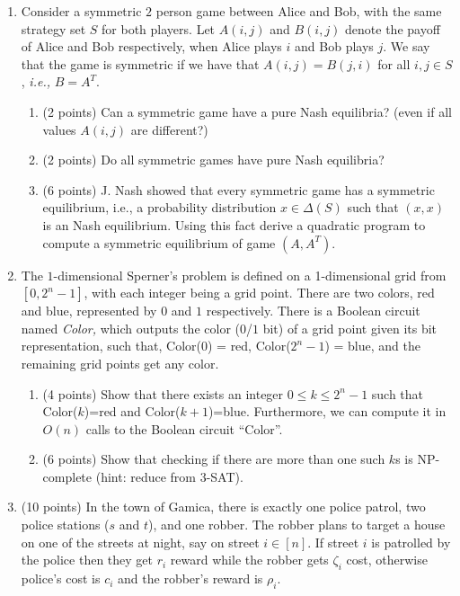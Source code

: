 \documentclass[11pt]{article}
\begin{document}
\begin{enumerate}
\item Consider a symmetric $2$ person game between Alice and Bob, with the same strategy set $S$ for both players. Let $A(i, j)$ and $B(i,j)$ denote the payoff of Alice and Bob respectively, when Alice plays $i$ and Bob plays $j$. We say that the game is symmetric if we have that $A(i,j) = B(j,i)$ for all $i,j \in S$, {\em i.e.,} $B=A^T$.

\begin{enumerate}
    \item (2 points) Can a symmetric game have a pure Nash equilibria? (even if all values $A(i,j)$ are different?)
    \item (2 points) Do all symmetric games have pure Nash equilibria?
    \item (6 points) J. Nash showed that every symmetric game has a symmetric equilibrium, i.e., a probability distribution $x\in \Delta(S)$ such that $(x,x)$ is an Nash equilibrium. Using this fact derive a quadratic program to compute a symmetric equilibrium of game $(A,A^T)$. \\
\end{enumerate}

\item The $1$-dimensional Sperner's problem is defined on a 1-dimensional grid from $[0, 2^n-1]$, with each integer being a grid
point. There are two colors, red and blue, represented by $0$ and $1$ respectively. 
There is a Boolean circuit named {\em Color,} which outputs the color ($0$/$1$ bit) of a grid point given its bit representation, such that,
Color($0$) = red, Color($2^n-1$) = blue, and the remaining grid points get any color.

\begin{enumerate}
    \item (4 points) Show that there exists an integer $0\le k \le 2^n-1$ such that Color($k$)=red and Color($k+1$)=blue. Furthermore, we can compute it in $O(n)$ calls to the Boolean circuit ``Color''.
    \item (6 points) Show that checking if there are more than one such $k$s is NP-complete (hint: reduce from 3-SAT).
\end{enumerate}


\item (10 points) In the town of Gamica, there is exactly one police patrol, two police stations ($s$ and $t$), and one robber. The robber plans to target a house on one of the streets at night, say on street $i\in [n]$. If street $i$ is patrolled by the police then they get $r_i$ reward while the robber gets $\zeta_i$ cost, otherwise police's cost is $c_i$ and the robber's reward is $\rho_i$. 


\end{enumerate}
\end{document}
